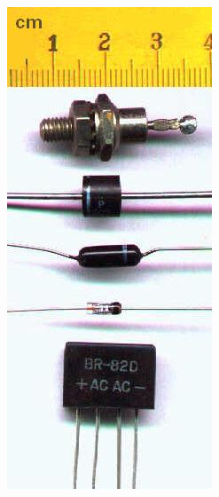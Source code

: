 \documentclass[10pt, handout]{beamer}
\begin{document}
\begin{frame}
\begin{center}
\includegraphics[angle=90,width=\textwidth]{diode.jpg}
\end{center}
\end{frame}
\end{document}
